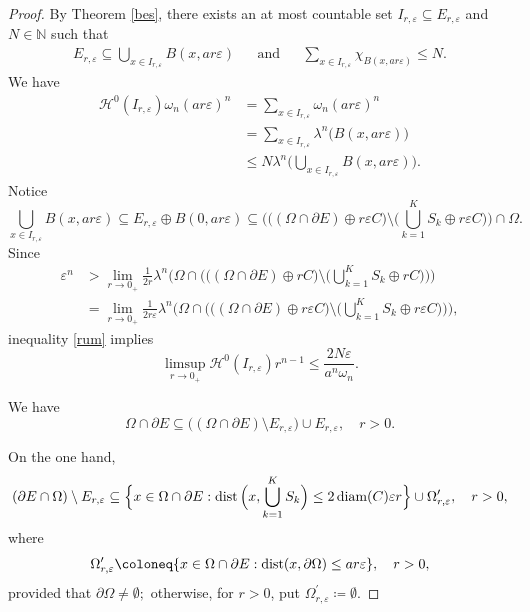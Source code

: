 \documentclass[pdflatex,sn-mathphys-num]{sn-jnl}
\theoremstyle{plain}
\theoremstyle{definition}
\DeclareMathOperator{\dist}{\textup{dist}}
\DeclareMathOperator{\diam}{\textup{diam}}
\begin{document}
\begin{proof}
By Theorem \ref{bes}, there exists an at most countable set $I_{r, \varepsilon}\subseteq E_{r, \varepsilon}$ and $N\in\mathbb{N}$ such that
\begin{align}
    E_{r, \varepsilon}\subseteq \bigcup_{x\in I_{r, \varepsilon}} B(x, ar\varepsilon)&&\text{and}&&\sum_{x\in I_{r, \varepsilon}}\chi_{B(x, ar\varepsilon)}\leq N.
\end{align}
We have \begin{equation*}
    \begin{split}
        \mathcal{H}^0(I_{r, \varepsilon})\omega_n (ar\varepsilon)^n&=\sum_{x\in I_{r, \varepsilon}}\omega_n (ar\varepsilon)^n\\&=\sum_{x\in I_{r, \varepsilon}}\lambda^n\big(B(x, ar\varepsilon)\big)\\&\leq N\lambda^n\Big(\bigcup_{x\in I_{r, \varepsilon}}B(x, ar\varepsilon)\Big).
    \end{split}
\end{equation*} 
Notice
\[
\bigcup_{x\in I_{r, \varepsilon}} B(x, ar\varepsilon)\subseteq E_{r, \varepsilon}\oplus B(0, ar\varepsilon) \subseteq \bigg(\big((\Omega\cap\partial E)\oplus r\varepsilon C \big)\setminus \Big(\bigcup_{k=1}^K S_k\oplus r\varepsilon C\Big)\bigg)\cap\Omega.
\]
Since \begin{equation*}\begin{split}
\varepsilon^n&>\lim_{r\to0_+}\frac{1}{2r}\lambda^n\Bigg(\Omega\cap\bigg(\Big((\Omega\cap\partial E)\oplus rC\Big)\setminus\Big(\bigcup_{k=1}^K S_k\oplus rC\Big)\bigg)\Bigg)\\&=\lim_{r\to0_+}\frac{1}{2r\varepsilon}\lambda^n\Bigg(\Omega\cap\bigg(\Big((\Omega\cap\partial E)\oplus r\varepsilon C\Big)\setminus\Big(\bigcup_{k=1}^K S_k\oplus r\varepsilon C\Big)\bigg)\Bigg),
\end{split}
\end{equation*} inequality \eqref{rum} implies
\begin{equation}\label{frf}\limsup_{r\to0_+}\mathcal{H}^0(I_{r, \varepsilon}) r^{n-1}\leq \frac{2N\varepsilon}{a^n\omega_n}.
\end{equation}

We have $$\Omega\cap\partial E\subseteq \big((\Omega\cap\partial E)\setminus E_{r, \varepsilon}\big)\cup E_{r, \varepsilon}, \quad r>0.$$

On the one hand,
\[
(\partial E\cap\Omega)\setminus E_{r, \varepsilon}\subseteq\Big\{x\in \Omega\cap\partial E : \dist\Big(x, \bigcup_{k=1} ^K S_k\Big)\leq 2\diam(C)\varepsilon r\Big\}\cup\Omega^{\prime}_{r, \varepsilon}, \quad r>0,
\] where $$\Omega^{\prime}_{r, \varepsilon}\coloneq\{x\in \Omega\cap\partial E:\dist(x, \partial\Omega)\leq ar\varepsilon\}, \quad r>0,$$ provided that $\partial\Omega\neq\emptyset;$ otherwise, for $r>0$, put $\Omega^{\prime}_{r, \varepsilon}\coloneq\emptyset$.


\end{proof}
\end{document}
